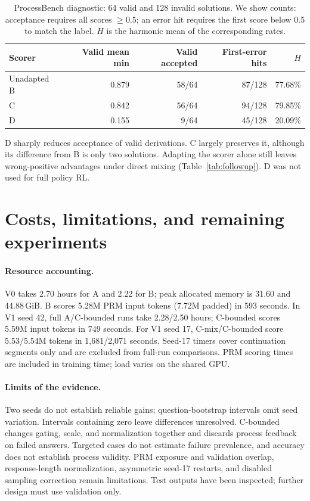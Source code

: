 \documentclass{article}
\begin{document}
\begin{table}[h!]
\caption{ProcessBench diagnostic: 64 valid and 128 invalid solutions. We show counts: acceptance requires all scores $\geq0.5$; an error hit requires the first score below 0.5 to match the label. $H$ is the harmonic mean of the corresponding rates.}
\centering\small
\begin{tabular}{@{}lrrrr@{}}
\toprule
Scorer & Valid mean min & Valid accepted & First-error hits & $H$ \\
\midrule
Unadapted B & 0.879 & 58/64 & 87/128 & 77.68\% \\
C & 0.842 & 56/64 & 94/128 & 79.85\% \\
D & 0.155 & 9/64 & 45/128 & 20.09\% \\
\bottomrule
\end{tabular}\label{tab:adaptation}
\end{table}
D sharply reduces acceptance of valid derivations. C largely preserves it, although its difference from B is only two solutions. Adapting the scorer alone still leaves wrong-positive advantages under direct mixing (Table~\ref{tab:followup}). D was not used for full policy RL.

\section{Costs, limitations, and remaining experiments}
\paragraph{Resource accounting.}
V0 takes 2.70 hours for A and 2.22 for B; peak allocated memory is 31.60 and 44.88\,GiB. B scores 5.28M PRM input tokens (7.72M padded) in 593 seconds. In V1 seed 42, full A/C-bounded runs take 2.28/2.50 hours; C-bounded scores 5.59M input tokens in 749 seconds. For V1 seed 17, C-mix/C-bounded score 5.53/5.54M tokens in 1,681/2,071 seconds. Seed-17 timers cover continuation segments only and are excluded from full-run comparisons. PRM scoring times are included in training time; load varies on the shared GPU.

\paragraph{Limits of the evidence.}
Two seeds do not establish reliable gains; question-bootstrap intervals omit seed variation. Intervals containing zero leave differences unresolved. C-bounded changes gating, scale, and normalization together and discards process feedback on failed answers. Targeted cases do not estimate failure prevalence, and accuracy does not establish process validity. PRM exposure and validation overlap, response-length normalization, asymmetric seed-17 restarts, and disabled sampling correction remain limitations. Test outputs have been inspected; further design must use validation only.
\end{document}
